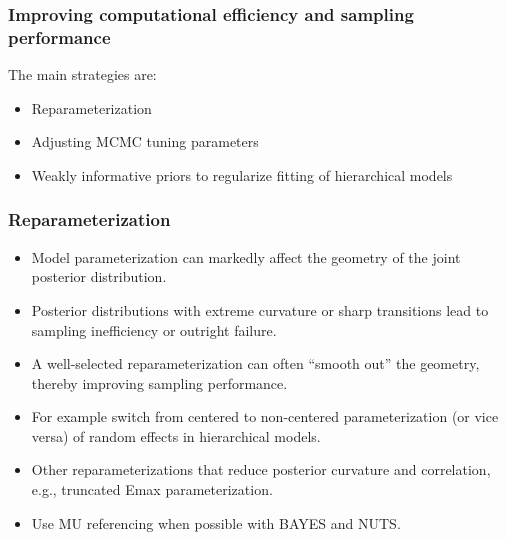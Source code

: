 \documentclass{beamer}
\begin{document}
\begin{frame}
  \frametitle{Improving computational efficiency and sampling
    performance}
  
The main strategies are:
\begin{itemize}
\item Reparameterization
\item Adjusting MCMC tuning parameters
\item Weakly informative priors to regularize fitting of hierarchical models
\end{itemize}

\end{frame}

\begin{frame}
  \frametitle{Reparameterization}

  \begin{itemize}
    \item<1-> Model parameterization can markedly affect the geometry of the
      joint posterior distribution.
    \item<2-> Posterior distributions with extreme curvature or sharp
      transitions lead to sampling inefficiency or outright failure.
    \item<3-> A well-selected reparameterization can often ``smooth out'' the
      geometry, thereby improving sampling performance.
    \item<4-> For example switch from centered to non-centered parameterization (or vice
      versa) of random effects in hierarchical models.
    \item<5-> Other reparameterizations that reduce posterior curvature and
      correlation, e.g., truncated Emax parameterization.
    \item<6-> Use MU referencing when possible with BAYES and NUTS.
  \end{itemize}
  
\end{frame}
\end{document}
